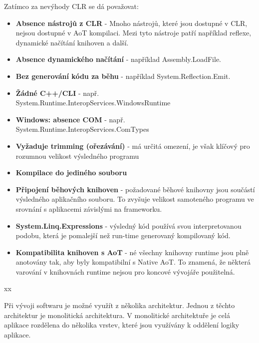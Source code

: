 
Zatímco za nevýhody CLR se dá považovat:

\begin{itemize}
    \item  \textbf{Absence nástrojů z CLR} - Mnoho nástrojů, které jsou dostupné v CLR, nejsou dostupné v AoT kompilaci. Mezi tyto nástroje patří například reflexe, dynamické načítání knihoven a další.
    \item \textbf{Absence dynamického načítání} - například Assembly.LoadFile.
    \item \textbf{Bez generování kódu za běhu} - například System.Reflection.Emit.
    \item \textbf{Žádné C++/CLI} - např. System.Runtime.InteropServices.WindowsRuntime
    \item \textbf{Windows: absence COM} - např. System.Runtime.InteropServices.ComTypes
    \item \textbf{Vyžaduje trimming (ořezávání)} - má určitá omezení, je však klíčový pro rozumnou velikost výsledného programu
    \item \textbf{Kompilace do jediného souboru} 
    \item \textbf{Připojení běhových knihoven} - požadované běhové knihovny jsou součástí výsledného aplikačního souboru. To zvyšuje velikost samoteného programu ve srovnání s aplikacemi závislými na frameworku.
    \item \textbf{System.Linq.Expressions} - výsledný kód používá svou interpretovanou podobu, která je pomalejší než run-time generovaný kompilovaný kód.
    \item \textbf{Kompatibilita knihoven s AoT} - né všechny knihovny runtime jsou plně anotovány tak, aby byly kompatibilní s Native AoT. To znamená, že některá varování v knihovnách runtime nejsou pro koncové vývojáře použitelná.
\end{itemize}


xx


Při vývoji softwaru je možné využít z několika architektur. Jednou z těchto architektur je monolitická architektura. V monolitické architektuře je celá aplikace rozdělena do několika vrstev, které jsou využívány k oddělení logiky aplikace.

